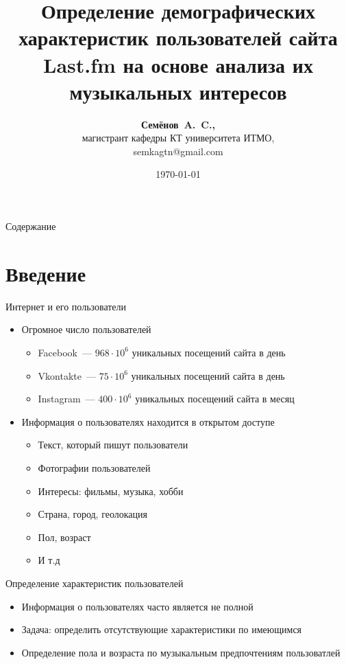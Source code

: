 \documentclass{beamer}
\title{Определение демографических характеристик пользователей
сайта Last.fm на основе анализа их музыкальных интересов}
\author{\textbf{Семёнов~A.~C.,} \\ 
    магистрант кафедры КТ университета ИТМО, \\
    semkagtn@gmail.com}
\institute{СПИСОК 2016}
\date{\today}
\begin{document}
\begin{frame}
  \titlepage
\end{frame}

\begin{frame}{Содержание}
  \tableofcontents
\end{frame}

\section{Введение}

\begin{frame}{Интернет и его пользователи}
  \begin{itemize}
      \item {Огромное число пользователей}
          \begin{itemize}
              \item {Facebook~--- $968 \cdot 10^{6}$ уникальных посещений сайта в день}
              \item {Vkontakte~--- $75 \cdot 10^{6}$ уникальных посещений сайта в день}
              \item {Instagram~--- $400 \cdot 10^{6}$ уникальных посещений сайта в месяц}
          \end{itemize}
      \item {Информация о пользователях находится в открытом доступе}
          \begin{itemize}
              \item {Текст, который пишут пользователи}
              \item {Фотографии пользователей}
              \item {Интересы: фильмы, музыка, хобби}
              \item {Страна, город, геолокация}
              \item {Пол, возраст}
              \item {И т.д}
          \end{itemize}
  \end{itemize}
\end{frame}

\begin{frame}{Определение характеристик пользователей}
  \begin{itemize}
      \item {Информация о пользователях часто является не полной}
      \item {Задача: определить отсутствующие характеристики по имеющимся}
      \item {Определение пола и возраста по музыкальным предпочтениям пользоватлей}
  \end{itemize}
\end{frame}
\end{document}
